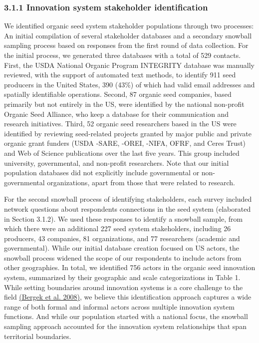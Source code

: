 \documentclass[twoside,12pt,final]{ucthesis-CA2012}
\begin{document}
\begin{ucmainmatter}
\hypertarget{innovation-system-stakeholder-identification}{%
\subsubsection{3.1.1 Innovation system stakeholder identification}\label{innovation-system-stakeholder-identification}}

We identified organic seed system stakeholder populations through two
processes: An initial compilation of several stakeholder databases and a
secondary snowball sampling process based on responses from the first
round of data collection. For the initial process, we generated three
databases with a total of 529 contacts. First, the USDA National Organic
Program INTEGRITY database was manually reviewed, with the support of
automated text methods, to identify 911 seed producers in the United
States, 390 (43\%) of which had valid email addresses and spatially
identifiable operations. Second, 87 organic seed companies, based
primarily but not entirely in the US, were identified by the national
non-profit Organic Seed Alliance, who keep a database for their
communication and research initiatives. Third, 52 organic seed
researchers based in the US were identified by reviewing seed-related
projects granted by major public and private organic grant funders (USDA
-SARE, -OREI, -NIFA, OFRF, and Ceres Trust) and Web of Science
publications over the last five years. This group included university,
governmental, and non-profit researchers. Note that our initial
population databases did not explicitly include governmental or
non-governmental organizations, apart from those that were related to
research.

For the second snowball process of identifying stakeholders, each survey
included network questions about respondents\textquotesingle{} connections in the seed
system (elaborated in Section 3.1.2). We used these responses to
identify a snowball sample, from which there were an additional 227 seed
system stakeholders, including 26 producers, 43 companies, 81
organizations, and 77 researchers (academic and governmental). While our
initial database creation focused on US actors, the snowball process
widened the scope of our respondents to include actors from other
geographies. In total, we identified 756 actors in the organic seed
innovation system, summarized by their geographic and scale
categorizations in Table 1. While setting boundaries around innovation
systems is a core challenge to the field \href{https://www.zotero.org/google-docs/?QRnDO8}{(Bergek et al.
2008)}, we believe this
identification approach captures a wide range of both formal and
informal actors across multiple innovation system functions. And while
our population started with a national focus, the snowball sampling
approach accounted for the innovation system relationships that span
territorial boundaries.


\end{ucmainmatter}
\end{document}
